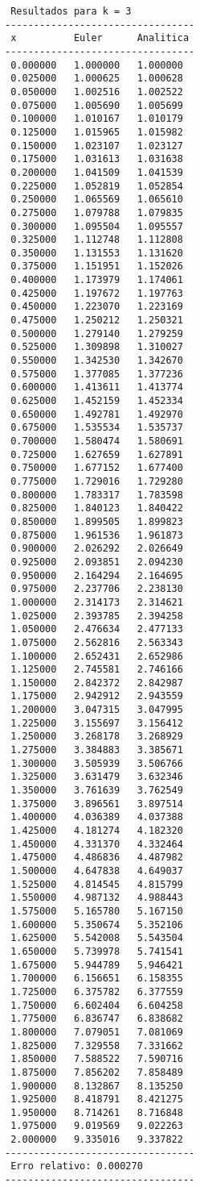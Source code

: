 \begin{verbatim}
 Resultados para k = 3
---------------------------------
 x          Euler      Analitica
---------------------------------
 0.000000   1.000000   1.000000
 0.025000   1.000625   1.000628
 0.050000   1.002516   1.002522
 0.075000   1.005690   1.005699
 0.100000   1.010167   1.010179
 0.125000   1.015965   1.015982
 0.150000   1.023107   1.023127
 0.175000   1.031613   1.031638
 0.200000   1.041509   1.041539
 0.225000   1.052819   1.052854
 0.250000   1.065569   1.065610
 0.275000   1.079788   1.079835
 0.300000   1.095504   1.095557
 0.325000   1.112748   1.112808
 0.350000   1.131553   1.131620
 0.375000   1.151951   1.152026
 0.400000   1.173979   1.174061
 0.425000   1.197672   1.197763
 0.450000   1.223070   1.223169
 0.475000   1.250212   1.250321
 0.500000   1.279140   1.279259
 0.525000   1.309898   1.310027
 0.550000   1.342530   1.342670
 0.575000   1.377085   1.377236
 0.600000   1.413611   1.413774
 0.625000   1.452159   1.452334
 0.650000   1.492781   1.492970
 0.675000   1.535534   1.535737
 0.700000   1.580474   1.580691
 0.725000   1.627659   1.627891
 0.750000   1.677152   1.677400
 0.775000   1.729016   1.729280
 0.800000   1.783317   1.783598
 0.825000   1.840123   1.840422
 0.850000   1.899505   1.899823
 0.875000   1.961536   1.961873
 0.900000   2.026292   2.026649
 0.925000   2.093851   2.094230
 0.950000   2.164294   2.164695
 0.975000   2.237706   2.238130
 1.000000   2.314173   2.314621
 1.025000   2.393785   2.394258
 1.050000   2.476634   2.477133
 1.075000   2.562816   2.563343
 1.100000   2.652431   2.652986
 1.125000   2.745581   2.746166
 1.150000   2.842372   2.842987
 1.175000   2.942912   2.943559
 1.200000   3.047315   3.047995
 1.225000   3.155697   3.156412
 1.250000   3.268178   3.268929
 1.275000   3.384883   3.385671
 1.300000   3.505939   3.506766
 1.325000   3.631479   3.632346
 1.350000   3.761639   3.762549
 1.375000   3.896561   3.897514
 1.400000   4.036389   4.037388
 1.425000   4.181274   4.182320
 1.450000   4.331370   4.332464
 1.475000   4.486836   4.487982
 1.500000   4.647838   4.649037
 1.525000   4.814545   4.815799
 1.550000   4.987132   4.988443
 1.575000   5.165780   5.167150
 1.600000   5.350674   5.352106
 1.625000   5.542008   5.543504
 1.650000   5.739978   5.741541
 1.675000   5.944789   5.946421
 1.700000   6.156651   6.158355
 1.725000   6.375782   6.377559
 1.750000   6.602404   6.604258
 1.775000   6.836747   6.838682
 1.800000   7.079051   7.081069
 1.825000   7.329558   7.331662
 1.850000   7.588522   7.590716
 1.875000   7.856202   7.858489
 1.900000   8.132867   8.135250
 1.925000   8.418791   8.421275
 1.950000   8.714261   8.716848
 1.975000   9.019569   9.022263
 2.000000   9.335016   9.337822
---------------------------------
 Erro relativo: 0.000270
---------------------------------


\end{verbatim}

